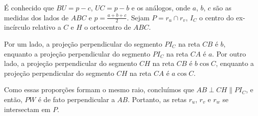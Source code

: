 É conhecido que $BU = p - c$,  $UC = p - b$ e os análogos, onde $a$, $b$, $c$ são as medidas dos lados de $ABC$ e $p = \frac{a+b+c}{2}$.
Sejam $P = r_u \cap r_v$, $I_C$ o centro do ex-incírculo relativo a $C$ e $H$ o ortocentro de $ABC$.

Por um lado, a projeção perpendicular do segmento $PI_C$ na reta $CB$ é $b$, enquanto a projeção perpendicular do segmento $PI_C$ na reta $CA$ é $a$. 
Por outro lado, a projeção perpendicular do segmento $CH$ na reta $CB$ é $b\cos C$, enquanto a projeção perpendicular do segmento $CH$ na reta $CA$ é $a\cos C$. 

Como essas proporções formam o mesmo raio, concluímos que $AB \perp CH \parallel PI_C$, e então, $PW$ é de fato perpendicular a $AB$. Portanto, as retas $r_u$, $r_v$ e $r_w$ se intersectam em $P$.
